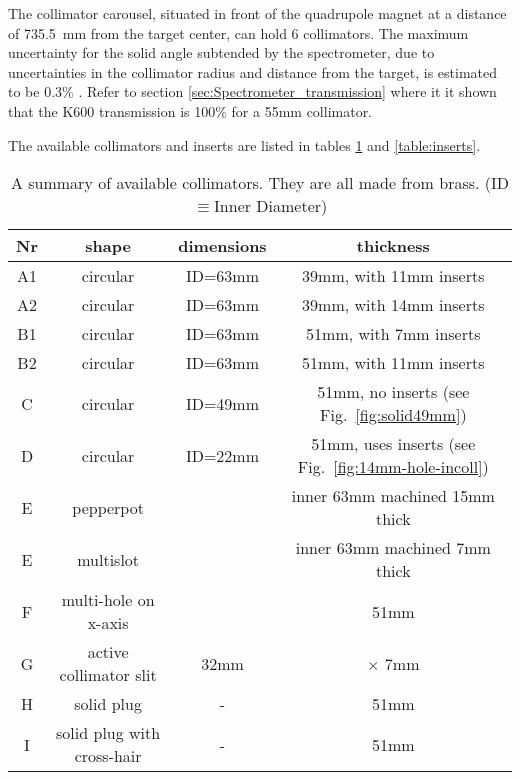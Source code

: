 \documentclass[11pt]{report}
\begin{document}
{}
\bigskip


The collimator carousel, situated in front of the quadrupole magnet 
at a distance of 735.5~mm from the target center, can hold 6 
collimators.
The maximum uncertainty for the solid angle subtended by the
spectrometer, due to uncertainties in the collimator radius and distance
from the target, is estimated to be 0.3\% \cite{New96}.
Refer to section \ref{sec:Spectrometer_transmission} where it it shown that
the K600 transmission is 100\% for a 55mm collimator.



The available collimators and inserts are listed in tables \ref{table:collimators}
and \ref{table:inserts}.




\begin{table}[!ht]
\centering
\begin{tabular}{c|c|c|c}
\hline
Nr & shape & dimensions & thickness\\
\hline
\hline
A1 & circular & ID=63mm    &  39mm, with 11mm inserts \\
A2 & circular & ID=63mm    &  39mm, with 14mm inserts \\
B1 & circular & ID=63mm    &  51mm, with 7mm  inserts \\
B2 & circular & ID=63mm    &  51mm, with 11mm inserts \\
C & circular  & ID=49mm    &  51mm, no inserts (see Fig.~\ref{fig:solid49mm})\\
D & circular  & ID=22mm    &  51mm, uses inserts (see Fig.~\ref{fig:14mm-hole-incoll}) \\
E & pepperpot &            & inner 63mm machined 15mm thick \\
E & multislot &            & inner 63mm machined 7mm thick \\
F & multi-hole on x-axis   &      & 51mm \\
G & active collimator slit & 32mm & $\times$ 7mm \\
H & solid plug             & -    & 51mm \\
I & solid plug with cross-hair & -& 51mm \\
\hline
\hline
\end{tabular}
\caption{A summary of available collimators. They are all made from brass.
(ID$\equiv$Inner Diameter)}
\label{table:collimators}
\end{table}
\end{document}
